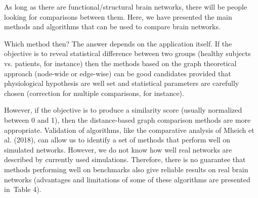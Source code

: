 
As long as there are functional/structural brain networks, there will be people looking for comparisons between them. Here, we have presented the main methods and algorithms that can be used to compare brain networks.

Which method then? The answer depends on the application itself. If the objective is to reveal statistical difference between two groups (healthy subjects vs. patients, for instance) then the methods based on the graph theoretical approach (node-wide or edge-wise) can be good candidates provided that physiological hypothesis are well set and statistical parameters are carefully chosen (correction for multiple comparisons, for instance).

However, if the objective is to produce a similarity score (usually normalized between 0 and 1), then the distance-based graph comparison methods are more appropriate. Validation of algorithms, like the comparative analysis of Mheich et al. (2018), can allow us to identify a set of methods that perform well on simulated networks. However, we do not know how well real networks are described by currently used simulations.
Therefore, there is no guarantee that methods performing well on benchmarks also give reliable results on real brain networks (advantages and limitations of some of these algorithms are presented in Table 4).

